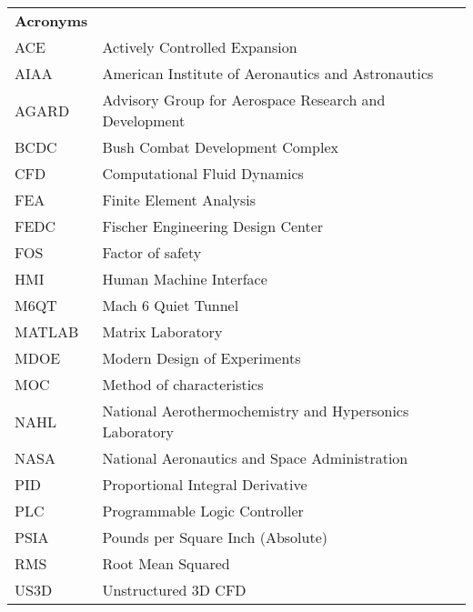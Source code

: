 \begin{spacing}{1.0}
    \begin{longtable}[htbp]{@{}p{} p{}@{}}
       
        \textbf{Acronyms}\\ [2ex] 
		ACE	& Actively Controlled Expansion\\ [2ex] %
        AIAA & American Institute of Aeronautics and Astronautics \\ [2ex]
        AGARD & Advisory Group for Aerospace Research and Development \\ [2ex]
		BCDC & Bush Combat Development Complex\\ [2ex]
		CFD	& Computational Fluid Dynamics\\ [2ex] 
		FEA & Finite Element Analysis\\	[2ex]
		FEDC & Fischer Engineering Design Center\\ [2ex]
        FOS & Factor of safety\\ [2ex]
        HMI & Human Machine Interface\\ [2ex]
        M6QT & Mach 6 Quiet Tunnel\\ [2ex]
        MATLAB & Matrix Laboratory\\ [2ex] 
        MDOE & Modern Design of Experiments\\ [2ex]
        MOC & Method of characteristics\\ [2ex]
		NAHL & National Aerothermochemistry and Hypersonics Laboratory\\ [2ex]
        NASA & National Aeronautics and Space Administration \\ [2ex]
        PID & Proportional Integral Derivative\\ [2ex]
        PLC & Programmable Logic Controller\\ [2ex]
        PSIA & Pounds per Square Inch (Absolute) \\ [2ex]
        RMS & Root Mean Squared \\ [2ex]
        US3D & Unstructured 3D CFD \\ [2ex]


\end{longtable}
\end{spacing}
